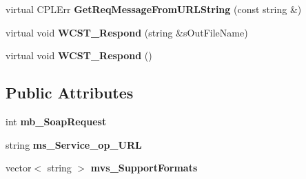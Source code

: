 \begin{DoxyCompactItemize}
\item 
\hypertarget{classWCS__T_a1f65ae0e62b09d43416bedea82bc9ef1}{
virtual CPLErr {\bfseries GetReqMessageFromURLString} (const string \&)}
\label{classWCS__T_a1f65ae0e62b09d43416bedea82bc9ef1}

\item 
\hypertarget{classWCS__T_a7f7078f64c43d74cfa9c51eb4563f159}{
virtual void {\bfseries WCST\_\-Respond} (string \&sOutFileName)}
\label{classWCS__T_a7f7078f64c43d74cfa9c51eb4563f159}

\item 
\hypertarget{classWCS__T_a834314259a1babfcaf15f74c68ef1ab6}{
virtual void {\bfseries WCST\_\-Respond} ()}
\label{classWCS__T_a834314259a1babfcaf15f74c68ef1ab6}

\end{DoxyCompactItemize}
\subsection*{Public Attributes}
\begin{DoxyCompactItemize}
\item 
\hypertarget{classWCS__T_afffa45e7cce0bed7a0d99cab8d385531}{
int {\bfseries mb\_\-SoapRequest}}
\label{classWCS__T_afffa45e7cce0bed7a0d99cab8d385531}

\item 
\hypertarget{classWCS__T_a2090c46c1f538cdbf60c83f3bf5f7498}{
string {\bfseries ms\_\-Service\_\-op\_\-URL}}
\label{classWCS__T_a2090c46c1f538cdbf60c83f3bf5f7498}

\item 
\hypertarget{classWCS__T_a9b491a75bb8b8779ba83a16f2abda4e3}{
vector$<$ string $>$ {\bfseries mvs\_\-SupportFormats}}
\label{classWCS__T_a9b491a75bb8b8779ba83a16f2abda4e3}

\end{DoxyCompactItemize}
